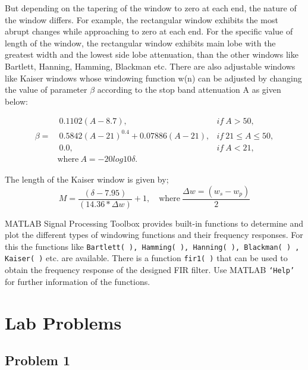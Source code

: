 \documentclass[a4paper,11pt]{article}
\begin{document}
But depending on the tapering of the window to zero at each end, the nature of the window
differs. For example, the rectangular window exhibits the most abrupt changes while
approaching to zero at each end. For the specific value of length of the window, the rectangular
window exhibits main lobe with the greatest width and the lowest side lobe attenuation, than the
other windows like Bartlett, Hanning, Hamming, Blackman etc. There are also adjustable
windows like Kaiser windows whose windowing function w(n) can be adjusted by changing the
value of parameter $\beta$ according to the stop band attenuation A as given below:

\begin{align*}
            & \ 0.1102(A-8.7),                    & if\   A  > 50,           \\
    \beta = & \ 0.5842(A-21)^{0.4}+0.07886(A-21), & if\   21 \leq A \leq 50, \\
            & \ 0.0,                              & if \  A < 21,            \\
            & \text{where}\  A= -20log10 \delta .
\end{align*}

The length of the Kaiser window is given by;
\begin{equation*}
    M = \frac{(\delta-7.95)} {(14.36*\Delta w)} +1, \quad \text{where}\  \frac {\Delta w= (w_s -w_p)}{2}
\end{equation*}




MATLAB Signal Processing Toolbox provides built-in functions to determine and plot the
different types of windowing functions and their frequency responses. For this the functions like
\texttt{Bartlett( ), Hamming( ), Hanning( ), Blackman( ) , Kaiser( )} etc. are available. There is a function
\texttt{fir1( )} that can be used to obtain the frequency response of the designed FIR filter. Use
MATLAB \texttt{‘Help’} for further information of the functions.


\section {Lab Problems}


\subsection{Problem 1}
\end{document}

